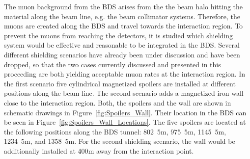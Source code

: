 \documentclass[12pt]{article}
\begin{document}
The muon background from the BDS arises from the the beam halo hitting the material along the beam line, e.g. the beam collimator systems.
Therefore, the muons are created along the BDS and travel towards the interaction region.
To prevent the muons from reaching the detectors, it is studied which shielding system would be effective and reasonable to be integrated in the BDS.
Several different shielding scenarios have already been under discussion and have been dropped, so that the two cases currently discussed and presented in this proceeding are both yielding acceptable muon rates at the interaction region.
In the first scenario five cylindrical magnetized spoilers are installed at different positions along the beam line.
The second scenario adds a magnetized iron wall close to the interaction region.
Both, the spoilers and the wall are shown in schematic drawings in Figure~\ref{fig:Spoilers_Wall}.
Their location in the BDS can be seen in Figure~\ref{fig:Spoilers_Wall_Locations}.
The five spoilers are located at the following positions along the BDS tunnel: \unit{802.5}{m}, \unit{975.5}{m}, \unit{1145.5}{m}, \unit{1234.5}{m}, and \unit{1358.5}{m}.
For the second shielding scenario, the wall would be additionally installed at \unit{400}{m} away from the interaction point.\cite{Lewis}
\end{document}
